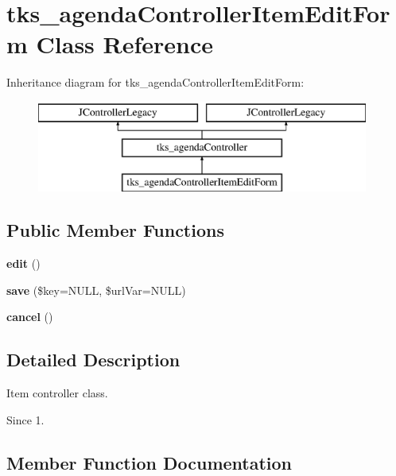 \section{tks\+\_\+agenda\+Controller\+Item\+Edit\+Form Class Reference}
\label{classtks__agenda_controller_item_edit_form}
Inheritance diagram for tks\+\_\+agenda\+Controller\+Item\+Edit\+Form\+:\begin{figure}[H]
\begin{center}
\leavevmode
\includegraphics[height=3.000000cm]{classtks__agenda_controller_item_edit_form}
\end{center}
\end{figure}
\subsection*{Public Member Functions}
\begin{DoxyCompactItemize}
\item 
\textbf{ edit} ()
\item 
\textbf{ save} (\$key=N\+U\+LL, \$url\+Var=N\+U\+LL)
\item 
\textbf{ cancel} ()
\end{DoxyCompactItemize}


\subsection{Detailed Description}
Item controller class.

\begin{DoxySince}{Since}
1. 
\end{DoxySince}


\subsection{Member Function Documentation}
\mbox{\label{classtks__agenda_controller_item_edit_form_a649b2b3005c687ae78c9d1d65e973493}} 
